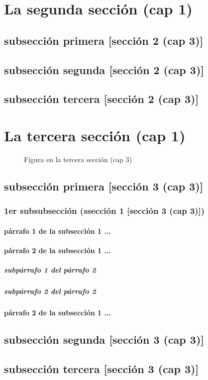 \documentclass[12pt,a4paper]{report}
\begin{document}
\section{La segunda sección (cap 1)}
\subsection{subsección primera [sección 2 (cap 3)]}
\subsection{subsección segunda [sección 2 (cap 3)]}
\subsection{subsección tercera [sección 2 (cap 3)]}
\section{La tercera sección (cap 1)}
\begin{figure}[H]
\caption{Figura en la tercera sección (cap 3)}
\end{figure}
\subsection{subsección primera [sección 3 (cap 3)]}
\subsubsection{1er subsubsección (ssección 1 [sección 3 (cap 3)])}
\paragraph{párrafo 1 de la subsección 1 ...}
\paragraph{párrafo 2 de la subsección 1 ...}
\subparagraph{subpárrafo 1 del párrafo 2}
\subparagraph{subpárrafo 2 del párrafo 2}
\paragraph{párrafo 2 de la subsección 1 ...}
\subsection{subsección segunda [sección 3 (cap 3)]}
\subsection{subsección tercera [sección 3 (cap 3)]}
\end{document}
